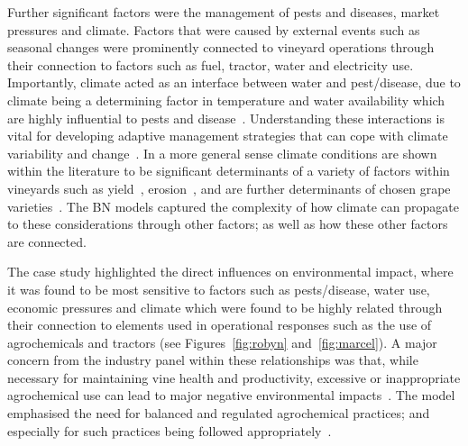 \documentclass[fleqn,10pt]{wlscirep}
\begin{document}
Further significant factors were the management of pests and diseases, market pressures and climate. Factors that were caused by external events such as seasonal changes were prominently connected to vineyard operations through their connection to factors such as fuel, tractor, water and electricity use. Importantly, climate acted as an interface between water and pest/disease, due to climate being a determining factor in temperature and water availability which are highly influential to pests and disease~. Understanding these interactions is vital for developing adaptive management strategies that can cope with climate variability and change~. In a more general sense climate conditions are shown within the literature to be significant determinants of a variety of factors within vineyards such as yield~, erosion~, and are further determinants of chosen grape varieties~. The BN models captured the complexity of how climate can propagate to these considerations through other factors; as well as how these other factors are connected.

The case study highlighted the direct influences on environmental impact, where it was found to be most sensitive to factors such as pests/disease, water use, economic pressures and climate which were found to be highly related through their connection to elements used in operational responses such as the use of agrochemicals and tractors (see Figures~\ref{fig:robyn} and~\ref{fig:marcel}). A major concern from the industry panel within these relationships was that, while necessary for maintaining vine health and productivity, excessive or inappropriate agrochemical use can lead to major negative environmental impacts~. The model emphasised the need for balanced and regulated agrochemical practices; and especially for such practices being followed appropriately~.

\end{document}
